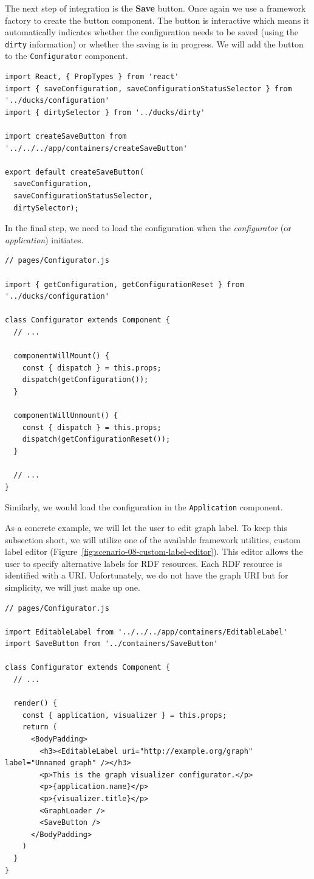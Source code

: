 The next step of integration is the \textbf{Save} button. Once again we use a framework factory to create the button component. The button is interactive which means it automatically indicates whether the configuration needs to be saved (using the \texttt{dirty} information) or whether the saving is in progress. We will add the button to the \texttt{Configurator} component.

\begin{verbatim}
import React, { PropTypes } from 'react'
import { saveConfiguration, saveConfigurationStatusSelector } from '../ducks/configuration'
import { dirtySelector } from '../ducks/dirty'

import createSaveButton from '../../../app/containers/createSaveButton'

export default createSaveButton(
  saveConfiguration,
  saveConfigurationStatusSelector,
  dirtySelector);
\end{verbatim}

In the final step, we need to load the configuration when the \emph{configurator} (or \emph{application}) initiates.

\begin{verbatim}
// pages/Configurator.js

import { getConfiguration, getConfigurationReset } from '../ducks/configuration'

class Configurator extends Component {
  // ...

  componentWillMount() {
    const { dispatch } = this.props;
    dispatch(getConfiguration());
  }

  componentWillUnmount() {
    const { dispatch } = this.props;
    dispatch(getConfigurationReset());
  }
  
  // ...
}
\end{verbatim}

Similarly, we would load the configuration in the \texttt{Application} component.

As a concrete example, we will let the user to edit graph label. To keep this subsection short, we will utilize one of the available framework utilities, custom label editor (Figure~\ref{fig:scenario-08-custom-label-editor}). This editor allows the user to specify alternative labels for RDF resources. Each RDF resource is identified with a URI. Unfortunately, we do not have the graph URI but for simplicity, we will just make up one.

\begin{verbatim}
// pages/Configurator.js

import EditableLabel from '../../../app/containers/EditableLabel'
import SaveButton from '../containers/SaveButton'

class Configurator extends Component {
  // ...

  render() {
    const { application, visualizer } = this.props;
    return (
      <BodyPadding>
        <h3><EditableLabel uri="http://example.org/graph" label="Unnamed graph" /></h3>
        <p>This is the graph visualizer configurator.</p>
        <p>{application.name}</p>
        <p>{visualizer.title}</p>
        <GraphLoader />
        <SaveButton />
      </BodyPadding>
    )
  }
}
\end{verbatim}

